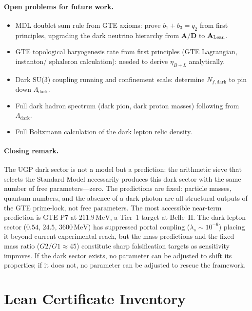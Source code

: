 \documentclass[11pt]{article}
\newcommand{\CatAL}{\ensuremath{\textbf{A}_{\rm Lean}}}
\newcommand{\CatAD}{\textbf{A/D}}
\begin{document}
\paragraph{Open problems for future work.}
\begin{itemize}[nosep]
\item MDL doublet sum rule from GTE axioms: prove $b_1+b_3=q_2$ from first principles,
      upgrading the dark neutrino hierarchy from $\CatAD$ to $\CatAL$.
\item GTE topological baryogenesis rate from first principles (GTE Lagrangian, instanton/
      sphaleron calculation): needed to derive $\eta_{B+L}$ analytically.
\item Dark SU(3) coupling running and confinement scale: determine $N_{f,\mathrm{dark}}$
      to pin down $\Lambda_\mathrm{dark}$.
\item Full dark hadron spectrum (dark pion, dark proton masses) following from $\Lambda_\mathrm{dark}$.
\item Full Boltzmann calculation of the dark lepton relic density.
\end{itemize}

\paragraph{Closing remark.}
The UGP dark sector is not a model but a prediction: the arithmetic sieve that selects
the Standard Model necessarily produces this dark sector with the same number of free
parameters---zero. The predictions are fixed: particle masses, quantum numbers, and
the absence of a dark photon are all structural outputs of the GTE prime-lock, not
free parameters. The most accessible near-term prediction is GTE-P7 at $211.9\,\mathrm{MeV}$,
a Tier~1 target at Belle~II. The dark lepton sector ($0.54$, $24.5$, $3600\,\mathrm{MeV}$)
has suppressed portal coupling ($\lambda_s \sim 10^{-6}$) placing it beyond current
experimental reach, but the mass predictions and the fixed mass ratio ($G2/G1 \approx 45$)
constitute sharp falsification targets as sensitivity improves. If the dark sector exists,
no parameter can be adjusted to shift its properties; if it does not, no parameter can be
adjusted to rescue the framework.

\appendix
\appendixpage

\section{Lean Certificate Inventory}
\label{app:lean}
\end{document}
